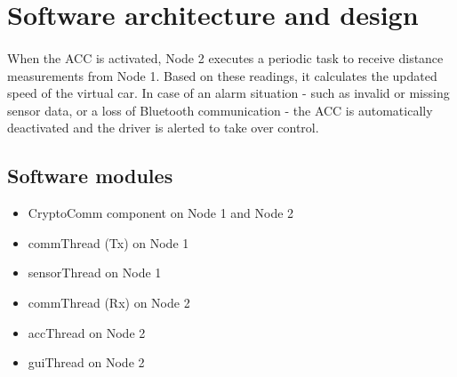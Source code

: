 \section{Software architecture and design}
\label{chapter2}

\paragraph
{}
When the ACC is activated, Node 2 executes a periodic task to receive distance measurements from Node 1. Based on these readings, it calculates the updated speed of the virtual car. In case of an alarm situation - such as invalid or missing sensor data, or a loss of Bluetooth communication - the ACC is automatically deactivated and the driver is alerted to take over control.

\subsection{Software modules}

\begin{itemize}
	\item CryptoComm component on Node 1 and Node 2
	\item commThread (Tx) on Node 1
	\item sensorThread on Node 1
	\item commThread (Rx) on Node 2
	\item accThread on Node 2
	\item guiThread on Node 2
\end{itemize}

